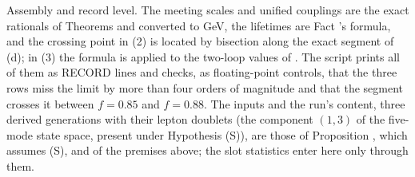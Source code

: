 Assembly and record level. The meeting scales and unified couplings are the exact rationals of Theorems  and  converted to GeV, the lifetimes are Fact 's formula, and the crossing point in (2) is located by bisection along the exact segment of (d); in (3) the formula is applied to the two-loop values of . The script prints all of them as RECORD lines and checks, as floating-point controls, that the three rows miss the limit by more than four orders of magnitude and that the segment crosses it between $f = 0.85$ and $f = 0.88$. The inputs and the run's content, three derived generations with their lepton doublets (the component $(1,3)$ of the five-mode state space, present under Hypothesis (S)), are those of Proposition , which assumes (S), and of the premises above; the slot statistics enter here only through them.
